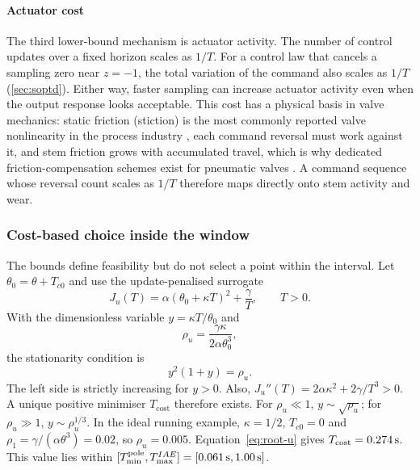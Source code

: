 \documentclass[a4paper,fleqn]{cas-sc}
\theoremstyle{remark}
\newcommand{\Tmin}{T_{\min}}
\newcommand{\Tmax}{T_{\max}}
\newcommand{\Tcost}{T_{\mathrm{cost}}}
\begin{document}
\paragraph{Actuator cost} The third lower-bound mechanism is actuator
activity. The number of control updates over a fixed horizon scales as $1/T$.
For a control law that cancels a sampling zero near $z=-1$, the total
variation of the command also scales as $1/T$ (\cref{sec:soptd}). Either way,
faster sampling can increase actuator activity even when the output response
looks acceptable. This cost has a physical basis in valve mechanics: static
friction (stiction) is the most commonly reported valve nonlinearity in the
process industry \citep{choudhury2005stiction}, each command reversal must
work against it, and stem friction grows with accumulated travel, which is why
dedicated friction-compensation schemes exist for pneumatic valves
\citep{hagglund2002friction}. A command sequence whose reversal count scales
as $1/T$ therefore maps directly onto stem activity and wear.

\subsubsection{Cost-based choice inside the window}
\label{sec:foptdopt}
The bounds define feasibility but do not select a point within the interval. Let $\theta_0=\theta+T_{c0}$ and use the update-penalised surrogate
\begin{equation}
J_u(T)=\alpha(\theta_0+\kappa T)^2+\frac{\gamma}{T},
\qquad T>0.
\label{eq:foptdcost}
\end{equation}
With the dimensionless variable $y=\kappa T/\theta_0$ and
\begin{equation}
\rho_u=\frac{\gamma\kappa}{2\alpha\theta_0^3},
\label{eq:rho-u}
\end{equation}
the stationarity condition is
\begin{equation}
y^2(1+y)=\rho_u.
\label{eq:root-u}
\end{equation}
The left side is strictly increasing for $y>0$. Also, $J_u''(T)=2\alpha\kappa^2+2\gamma/T^3>0$. A unique positive minimiser $\Tcost$ therefore exists. For $\rho_u\ll1$, $y\sim\sqrt{\rho_u}$; for $\rho_u\gg1$, $y\sim\rho_u^{1/3}$. In the ideal running example, $\kappa=1/2$, $T_{c0}=0$ and $\rho_1=\gamma/(\alpha\theta^3)=0.02$, so $\rho_u=0.005$. Equation~\eqref{eq:root-u} gives $\Tcost=\SI{\RunTcost}{\second}$. This value lies within $[\Tmin^{\mathrm{pole}},\Tmax^{IAE}]=[\SI{\RunTminPole}{\second},\SI{\RunTmaxIAE}{\second}]$.
\end{document}
